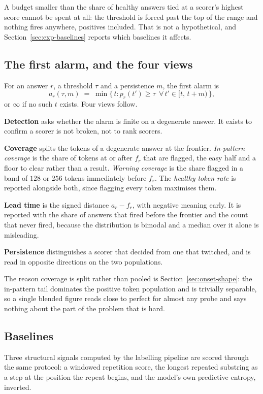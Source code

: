 \documentclass{article}
\begin{document}
A budget smaller than the share of healthy answers tied at a scorer's highest
score cannot be spent at all: the threshold is forced past the top of the range
and nothing fires anywhere, positives included. That is not a hypothetical, and
Section~\ref{sec:exp-baselines} reports which baselines it affects.

\subsection{The first alarm, and the four views}
For an answer $r$, a threshold $\tau$ and a persistence $m$, the first alarm is
\begin{equation}
  a_r(\tau,m) \;=\; \min\{\,t : p_r(t') \geq \tau \ \ \forall\, t' \in [t,\,t+m)\,\},
\end{equation}
or $\infty$ if no such $t$ exists. Four views follow.

\textbf{Detection} asks whether the alarm is finite on a degenerate answer. It
exists to confirm a scorer is not broken, not to rank scorers.

\textbf{Coverage} splits the tokens of a degenerate answer at the frontier.
\emph{In-pattern coverage} is the share of tokens at or after $f_r$ that are
flagged, the easy half and a floor to clear rather than a result. \emph{Warning
coverage} is the share flagged in a band of $128$ or $256$ tokens immediately
before $f_r$. The \emph{healthy token rate} is reported alongside both, since
flagging every token maximises them.

\textbf{Lead time} is the signed distance $a_r - f_r$, with negative meaning
early. It is reported with the share of answers that fired before the frontier
and the count that never fired, because the distribution is bimodal and a median
over it alone is misleading.

\textbf{Persistence} distinguishes a scorer that decided from one that twitched,
and is read in opposite directions on the two populations.

The reason coverage is split rather than pooled is Section~\ref{sec:onset-shape}:
the in-pattern tail dominates the positive token population and is trivially
separable, so a single blended figure reads close to perfect for almost any probe
and says nothing about the part of the problem that is hard.

\subsection{Baselines}
\label{sec:baselines}
Three structural signals computed by the labelling pipeline are scored through
the same protocol: a windowed repetition score, the longest repeated substring as
a step at the position the repeat begins, and the model's own predictive entropy,
inverted.
\end{document}
